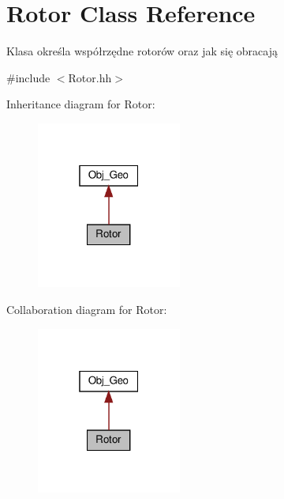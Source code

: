\hypertarget{class_rotor}{}\section{Rotor Class Reference}
\label{class_rotor}


Klasa określa współrzędne rotorów oraz jak się obracają  




{\ttfamily \#include $<$Rotor.\+hh$>$}



Inheritance diagram for Rotor\+:
\nopagebreak
\begin{figure}[H]
\begin{center}
\leavevmode
\includegraphics[width=135pt]{class_rotor__inherit__graph}
\end{center}
\end{figure}


Collaboration diagram for Rotor\+:
\nopagebreak
\begin{figure}[H]
\begin{center}
\leavevmode
\includegraphics[width=135pt]{class_rotor__coll__graph}
\end{center}
\end{figure}
